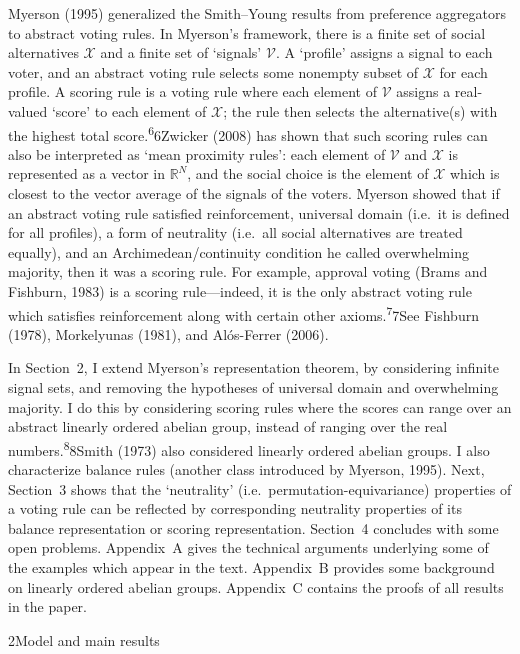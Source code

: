 \documentclass[
]{article}
\begin{document}
Myerson (1995) generalized the Smith--Young results from preference
aggregators to abstract voting rules. In Myerson's framework, there is a
finite set of social alternatives \(\mathcal{X}\) and a finite set of
`signals' \(\mathcal{V}\). A `profile' assigns a signal to each voter,
and an abstract voting rule selects some nonempty subset of
\(\mathcal{X}\) for each profile. A scoring rule is a voting rule where
each element of \(\mathcal{V}\) assigns a real-valued `score' to each
element of \(\mathcal{X}\); the rule then selects the alternative(s)
with the highest total score.\textsuperscript{6}6Zwicker (2008) has
shown that such scoring rules can also be interpreted as `mean proximity
rules': each element of \(\mathcal{V}\) and \(\mathcal{X}\) is
represented as a vector in \(\mathbb{R}^{N}\), and the social choice is
the element of \(\mathcal{X}\) which is closest to the vector average of
the signals of the voters. Myerson showed that if an abstract voting
rule satisfied reinforcement, universal domain (i.e.~it is defined for
all profiles), a form of neutrality (i.e.~all social alternatives are
treated equally), and an Archimedean/continuity condition he called
overwhelming majority, then it was a scoring rule. For example, approval
voting (Brams and Fishburn, 1983) is a scoring rule---indeed, it is the
only abstract voting rule which satisfies reinforcement along with
certain other axioms.\textsuperscript{7}7See Fishburn (1978),
Morkelyunas (1981), and Alós-Ferrer (2006).

In Section~2, I extend Myerson's representation theorem, by considering
infinite signal sets, and removing the hypotheses of universal domain
and overwhelming majority. I do this by considering scoring rules where
the scores can range over an abstract linearly ordered abelian group,
instead of ranging over the real numbers.\textsuperscript{8}8Smith
(1973) also considered linearly ordered abelian groups. I also
characterize balance rules (another class introduced by Myerson, 1995).
Next, Section~3 shows that the `neutrality'
(i.e.~permutation-equivariance) properties of a voting rule can be
reflected by corresponding neutrality properties of its balance
representation or scoring representation. Section~4 concludes with some
open problems. Appendix~A gives the technical arguments underlying some
of the examples which appear in the text. Appendix~B provides some
background on linearly ordered abelian groups. Appendix~C contains the
proofs of all results in the paper.

\protect{}\label{s000010}
2Model and main results
\end{document}

